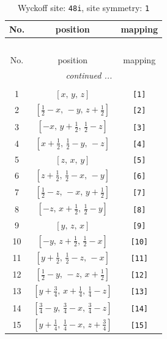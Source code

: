 \documentclass[fleqn,8pt]{jsarticle}
\begin{document}
\begin{longtable}{ccc}
\caption{Wyckoff site: {\tt 48i}, site symmetry: {\tt 1}}
 \\
 \hline \hline
No. & position & mapping \\ \hline \endfirsthead

\multicolumn{2}{l}{\tablename\ \thetable{}} \\
 \hline \hline
No. & position & mapping \\ \hline \endhead

 \hline \hline
\multicolumn{2}{r}{\footnotesize\it continued ...} \\ \endfoot

 \hline \hline
\multicolumn{2}{r}{} \\ \endlastfoot

1 & $\left[ x,\, y,\, z \right]$ & {\tt [1]} \\ \hline
2 & $\left[ \frac{1}{2} - x,\, - y,\, z + \frac{1}{2} \right]$ & {\tt [2]} \\ \hline
3 & $\left[ - x,\, y + \frac{1}{2},\, \frac{1}{2} - z \right]$ & {\tt [3]} \\ \hline
4 & $\left[ x + \frac{1}{2},\, \frac{1}{2} - y,\, - z \right]$ & {\tt [4]} \\ \hline
5 & $\left[ z,\, x,\, y \right]$ & {\tt [5]} \\ \hline
6 & $\left[ z + \frac{1}{2},\, \frac{1}{2} - x,\, - y \right]$ & {\tt [6]} \\ \hline
7 & $\left[ \frac{1}{2} - z,\, - x,\, y + \frac{1}{2} \right]$ & {\tt [7]} \\ \hline
8 & $\left[ - z,\, x + \frac{1}{2},\, \frac{1}{2} - y \right]$ & {\tt [8]} \\ \hline
9 & $\left[ y,\, z,\, x \right]$ & {\tt [9]} \\ \hline
10 & $\left[ - y,\, z + \frac{1}{2},\, \frac{1}{2} - x \right]$ & {\tt [10]} \\ \hline
11 & $\left[ y + \frac{1}{2},\, \frac{1}{2} - z,\, - x \right]$ & {\tt [11]} \\ \hline
12 & $\left[ \frac{1}{2} - y,\, - z,\, x + \frac{1}{2} \right]$ & {\tt [12]} \\ \hline
13 & $\left[ y + \frac{3}{4},\, x + \frac{1}{4},\, \frac{1}{4} - z \right]$ & {\tt [13]} \\ \hline
14 & $\left[ \frac{3}{4} - y,\, \frac{3}{4} - x,\, \frac{3}{4} - z \right]$ & {\tt [14]} \\ \hline
15 & $\left[ y + \frac{1}{4},\, \frac{1}{4} - x,\, z + \frac{3}{4} \right]$ & {\tt [15]} \\ \hline

\end{longtable}
\end{document}
